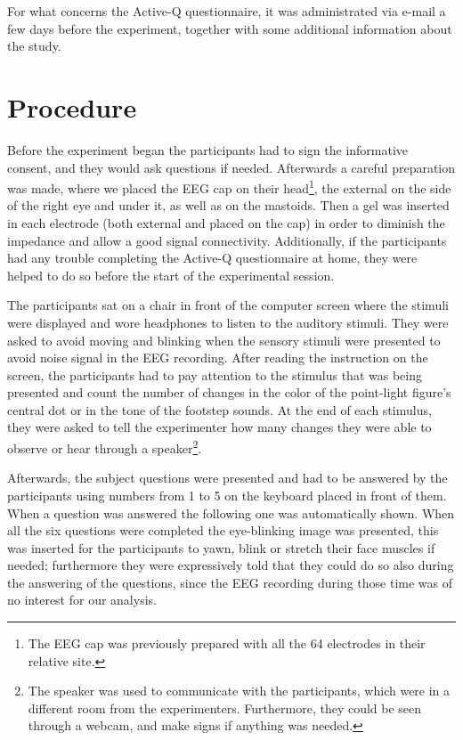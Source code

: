 For what concerns the Active-Q questionnaire, it was administrated via e-mail a few days before the experiment, together with some additional information about the study.

\section{Procedure}
Before the experiment began the participants had to sign the informative consent, and they would ask questions if needed. Afterwards a careful preparation was made, where we placed the EEG cap on their head\footnote{The EEG cap was previously prepared with all the 64 electrodes in their relative site.}, the external on the side of the right eye and under it, as well as on the mastoids. Then a gel was inserted in each electrode (both external and placed on the cap) in order to diminish the impedance and allow a good signal connectivity. 
Additionally, if the participants had any trouble completing the Active-Q questionnaire at home, they were helped to do so before the start of the experimental session. 

The participants sat on a chair in front of the computer screen where the stimuli were displayed and wore headphones to listen to the auditory stimuli. They were asked to avoid moving and blinking when the sensory stimuli were presented to avoid noise signal in the EEG recording. 
After reading the instruction on the screen, the participants had to pay attention to the stimulus that was being presented and count the number of changes in the color of the point-light figure's central dot or in the tone of the footstep sounds. At the end of each stimulus, they were asked to tell the experimenter how many changes they were able to observe or hear through a speaker\footnote{The speaker was used to communicate with the participants, which were in a different room from the experimenters. Furthermore, they could be seen through a webcam, and make signs if anything was needed.}. 

Afterwards, the subject questions were presented and had to be answered by the participants using numbers from 1 to 5 on the keyboard placed in front of them. When a question was answered the following one was automatically shown. When all the six questions were completed the eye-blinking image was presented, this was inserted for the participants to yawn, blink or stretch their face muscles if needed; furthermore they were expressively told that they could do so also during the answering of the questions, since the EEG recording during those time was of no interest for our analysis.  

